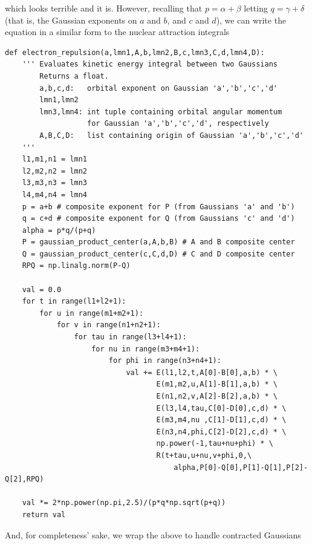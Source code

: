 which looks terrible and it is. However, recalling that
$p = \alpha + \beta$ letting $q = \gamma + \delta$ (that is, the
Gaussian exponents on $a$ and $b$, and $c$ and $d$), we can write the
equation in a similar form to the nuclear attraction integrals

\begin{lstlisting}[style=MyPython]
def electron_repulsion(a,lmn1,A,b,lmn2,B,c,lmn3,C,d,lmn4,D):
    ''' Evaluates kinetic energy integral between two Gaussians
        Returns a float.
        a,b,c,d:   orbital exponent on Gaussian 'a','b','c','d'
        lmn1,lmn2
        lmn3,lmn4: int tuple containing orbital angular momentum
                   for Gaussian 'a','b','c','d', respectively
        A,B,C,D:   list containing origin of Gaussian 'a','b','c','d'
    '''
    l1,m1,n1 = lmn1
    l2,m2,n2 = lmn2
    l3,m3,n3 = lmn3
    l4,m4,n4 = lmn4
    p = a+b # composite exponent for P (from Gaussians 'a' and 'b')
    q = c+d # composite exponent for Q (from Gaussians 'c' and 'd')
    alpha = p*q/(p+q)
    P = gaussian_product_center(a,A,b,B) # A and B composite center
    Q = gaussian_product_center(c,C,d,D) # C and D composite center
    RPQ = np.linalg.norm(P-Q)

    val = 0.0
    for t in range(l1+l2+1):
        for u in range(m1+m2+1):
            for v in range(n1+n2+1):
                for tau in range(l3+l4+1):
                    for nu in range(m3+m4+1):
                        for phi in range(n3+n4+1):
                            val += E(l1,l2,t,A[0]-B[0],a,b) * \
                                   E(m1,m2,u,A[1]-B[1],a,b) * \
                                   E(n1,n2,v,A[2]-B[2],a,b) * \
                                   E(l3,l4,tau,C[0]-D[0],c,d) * \
                                   E(m3,m4,nu ,C[1]-D[1],c,d) * \
                                   E(n3,n4,phi,C[2]-D[2],c,d) * \
                                   np.power(-1,tau+nu+phi) * \
                                   R(t+tau,u+nu,v+phi,0,\
                                       alpha,P[0]-Q[0],P[1]-Q[1],P[2]-Q[2],RPQ)

    val *= 2*np.power(np.pi,2.5)/(p*q*np.sqrt(p+q))
    return val
\end{lstlisting}

And, for completeness' sake, we wrap the above to handle contracted
Gaussians

